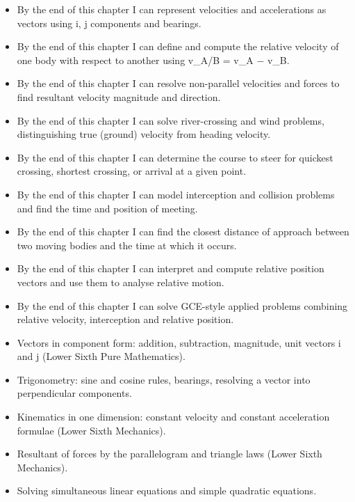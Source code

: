 \documentclass[11pt]{article}
\begin{document}
\begin{objectifs}
\begin{itemize}
\item By the end of this chapter I can represent velocities and accelerations as vectors using i, j components and bearings.
\item By the end of this chapter I can define and compute the relative velocity of one body with respect to another using v\_A/B = v\_A − v\_B.
\item By the end of this chapter I can resolve non-parallel velocities and forces to find resultant velocity magnitude and direction.
\item By the end of this chapter I can solve river-crossing and wind problems, distinguishing true (ground) velocity from heading velocity.
\item By the end of this chapter I can determine the course to steer for quickest crossing, shortest crossing, or arrival at a given point.
\item By the end of this chapter I can model interception and collision problems and find the time and position of meeting.
\item By the end of this chapter I can find the closest distance of approach between two moving bodies and the time at which it occurs.
\item By the end of this chapter I can interpret and compute relative position vectors and use them to analyse relative motion.
\item By the end of this chapter I can solve GCE-style applied problems combining relative velocity, interception and relative position.
\end{itemize}
\end{objectifs}

\begin{prerequis}
\begin{itemize}
\item Vectors in component form: addition, subtraction, magnitude, unit vectors i and j (Lower Sixth Pure Mathematics).
\item Trigonometry: sine and cosine rules, bearings, resolving a vector into perpendicular components.
\item Kinematics in one dimension: constant velocity and constant acceleration formulae (Lower Sixth Mechanics).
\item Resultant of forces by the parallelogram and triangle laws (Lower Sixth Mechanics).
\item Solving simultaneous linear equations and simple quadratic equations.
\end{itemize}
\end{prerequis}
\end{document}
